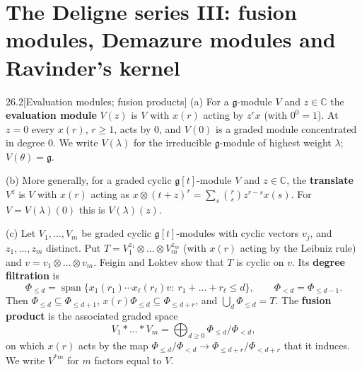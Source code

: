 \documentclass[11pt,openany]{book}
\theoremstyle{definition}
\theoremstyle{plain}
\newcommand{\C}{{\mathbb{C}}}
\begin{document}
\chapter[The Deligne series III: fusion modules and Ravinder's kernel]{The Deligne series III: fusion modules, Demazure modules and Ravinder's kernel}
\begingroup
\providecommand{\ltwentysixg}{\mathfrak g}
\providecommand{\ltwentysixgt}{\mathfrak g[t]}
\providecommand{\ltwentysixWloc}{W_{\mathrm{loc}}}
\providecommand{\ltwentysixD}{\mathcal D}
\providecommand{\ltwentysixF}{\mathcal F}
\providecommand{\ltwentysixU}{U}
\providecommand{\ltwentysixcyc}{\operatorname{cyc}}
\providecommand{\ltwentysixHilb}{\operatorname{Hilb}}
\providecommand{\ltwentysixqb}[2]{\genfrac{[}{]}{0pt}{}{#1}{#2}_q}
\par\medskip
\begin{bdefinition}{26.2}[Evaluation modules; fusion products]
(a) For a $\ltwentysixg$-module $V$ and $z\in\C$ the \textbf{evaluation module} $V(z)$ is $V$ with $x(r)$ acting by $z^rx$
(with $0^0=1$). At $z=0$ every $x(r)$, $r\ge1$, acts by $0$, and $V(0)$ is a graded module concentrated in degree $0$.
We write $V(\lambda)$ for the irreducible $\ltwentysixg$-module of highest weight $\lambda$; $V(\theta)=\ltwentysixg$.

(b) More generally, for a graded cyclic $\ltwentysixgt$-module $V$ and $z\in\C$, the \textbf{translate} $V^{z}$ is $V$ with
$x(r)$ acting as $x\otimes(t+z)^r=\sum_s\binom rs z^{r-s}x(s)$. For $V=V(\lambda)(0)$ this is $V(\lambda)(z)$.

(c) Let $V_1,\dots,V_m$ be graded cyclic $\ltwentysixgt$-modules with cyclic vectors $v_j$, and $z_1,\dots,z_m$ distinct.
Put $T=V_1^{z_1}\otimes\dots\otimes V_m^{z_m}$ (with $x(r)$ acting by the Leibniz rule) and $v=v_1\otimes\dots\otimes v_m$.
Feigin and Loktev show that $T$ is cyclic on $v$. Its \textbf{degree filtration} is
\begin{equation*}
\Phi_{\le d}=\operatorname{span}\{x_1(r_1)\cdots x_\ell(r_\ell)v:\ r_1+\dots+r_\ell\le d\},\qquad \Phi_{<d}=\Phi_{\le d-1}.
\end{equation*}
Then $\Phi_{\le d}\subseteq\Phi_{\le d+1}$, $x(r)\Phi_{\le d}\subseteq\Phi_{\le d+r}$, and $\bigcup_d\Phi_{\le d}=T$. The
\textbf{fusion product} is the associated graded space
\begin{equation*}
V_1*\dots*V_m=\bigoplus_{d\ge0}\Phi_{\le d}/\Phi_{<d},
\end{equation*}
on which $x(r)$ acts by the map $\Phi_{\le d}/\Phi_{<d}\to\Phi_{\le d+r}/\Phi_{<d+r}$ that it induces. We write $V^{*m}$ for
$m$ factors equal to $V$.
\end{bdefinition}
\end{document}
